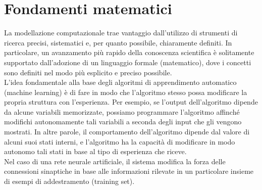 \section{Fondamenti matematici}

La modellazione computazionale trae vantaggio dall'utilizzo di strumenti di
ricerca precisi, sistematici e, per quanto possibile, chiaramente definiti. In
particolare, un avanzamento più rapido della conoscenza scientifica è
solitamente supportato dall'adozione di un linguaggio formale (matematico), dove
i concetti sono definiti nel modo più esplicito e preciso possibile.\\
L'idea fondamentale alla base degli algoritmi di apprendimento automatico
(machine learning) è di fare in modo che l'algoritmo stesso possa modificare la
propria struttura con l'esperienza. Per esempio, se l'output dell'algoritmo
dipende da alcune variabili memorizzate, possiamo programmare l'algoritmo
affinché modifichi autonomamente tali variabili a seconda degli input che gli
vengono mostrati. In altre parole, il comportamento dell'algoritmo dipende dal
valore di alcuni suoi stati interni, e l'algoritmo ha la capacità di modificare
in modo autonomo tali stati in base al tipo di esperienza che riceve.\\
Nel caso di una rete neurale artificiale, il sistema modifica la forza delle
connessioni sinaptiche in base alle informazioni rilevate in un particolare
insieme di esempi di addestramento (training set). 
